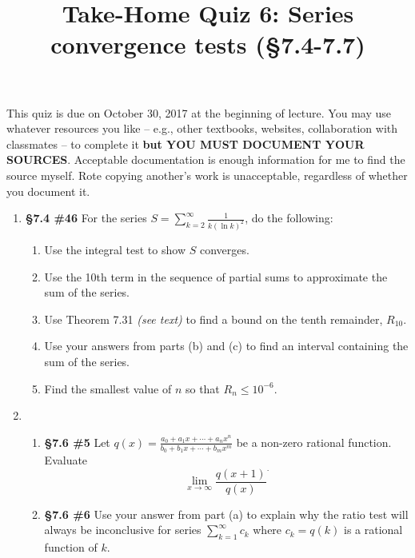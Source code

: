 \documentclass[%
]{article}
\title{\vspace{-3.5pc} 
	\flushleft \bf \Large Take-Home Quiz 6: Series convergence tests %
	 (\S7.4-7.7)}
\date{}
\begin{document}
\maketitle

\vspace{-3pc}
 This quiz is due on October 30, 2017 at the beginning of lecture.  You may use whatever resources you like -- e.g., other textbooks, websites, collaboration with classmates -- to complete it \textbf{but YOU MUST DOCUMENT YOUR SOURCES}.  Acceptable documentation is enough information for me to find the source myself.  Rote copying another's work is unacceptable, regardless of whether you document it.  

\noindent\hrulefill

\begin{enumerate}
\item {\bf \S7.4 \#46} For the series $S=\sum_{k=2}^{\infty}\frac{1}{k(\ln k)^2}$, do the following:
	\begin{enumerate}
	\item Use the integral test to show $S$ converges.
	\item Use the 10th term in the sequence of partial sums to approximate the sum of the series.
	\item Use Theorem 7.31 \textit{(see text)} to find a bound on the tenth remainder, $R_{10}$.
	\item Use your answers from parts (b) and (c) to find an interval containing the sum of the series.
	\item Find the smallest value of $n$ so that $R_n\leq 10^{-6}$.
	\end{enumerate}

\item \begin{enumerate}
	\item {\bf \S7.6 \#5} Let $q(x)=\frac{a_0+a_1x+\cdots+a_nx^n}{b_0+b_1x+\cdots+b_mx^m}$ be a non-zero rational function.  Evaluate
	\[
	\lim_{x\to\infty}\frac{q(x+1)}{q(x)}^.
	\]
	\item {\bf \S7.6 \#6} Use your answer from part (a) to explain why the ratio test will always be inconclusive for series $\sum_{k=1}^{\infty}c_k$ where $c_k=q(k)$ is a rational function of $k$.
	\end{enumerate}
	

\end{enumerate}
\end{document}

